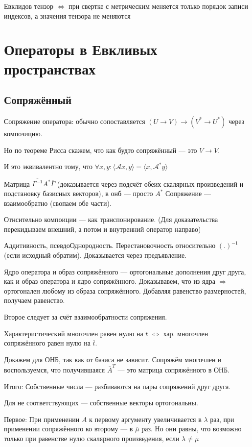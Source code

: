\documentclass[12pt, a4paper]{article}
\begin{document}
Евклидов тензор $\Leftrightarrow$ при свертке с метрическим меняется только порядок записи индексов, а значения тензора не меняются

\section{Операторы в Евкливых пространствах}

\subsection{Сопряжённый}

Сопряжение оператора: обычно сопоставляется $(U → V) → (V^* → U^*)$ через композицию.

Но по теореме Рисса скажем, что как будто сопряжённый — это $V → V$.

И это эквивалентно тому, что $\forall x, y: \langle \mathcal{A} x, y \rangle = \langle x,  \mathcal{A}^* y \rangle$


Матрица $\overline{\Gamma^{-1}} A^* \overline{\Gamma}$ (доказывается через подсчёт обеих скалярных произведений и подстановку базисных векторов), 
в онб — просто $A^*$
Сопряжение — взаимообратно (свопаем обе части).

Отнсительно компоиции — как транспонирование. (Для доказательства перекидываем внешний, а потом и внутренний оператор направо)

Аддитивность, псевдоОднородность.
Перестановочность относительно $(.)^{-1}$ (если исходный обратим). Доказывается через предъявление.

Ядро оператора и образ сопряжённого — ортогональные дополнения друг друга, как и образ оператора и ядро сопряжённого.
Доказывавем, что из ядра $\Rightarrow$ ортогонален любому из образа сопряжённого. Добавляя равенство размерностей, получаем равенство. 

Второе следует за счёт взаимообратности сопряжения.

Характеристический многочлен равен нулю на $t$ $\Leftrightarrow$ хар. многочлен сопряжённого равен нулю на $\overline{t}$.

Докажем для ОНБ, так как от базиса не зависит. Сопряжём многочлен и воспользуемся, что получившаяся $\overline{A}^T$ — это матрица сопряжённого в ОНБ.

Итого: Собственные числа — разбиваются на пары сопряжений друг друга.

Для не соответствующих — собственные векторы ортогональны.

Первое: При применении $A$ к первому аргументу увеличивается в $\lambda$ раз, при применении сопряжённого ко второму — в $\overline{\mu}$ раз.
Но они равны, что возможно только при равенстве нулю скалярного произведения, если $\lambda \neq \overline{\mu}$
\end{document}
